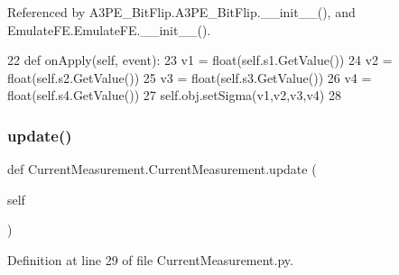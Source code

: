 Referenced by A3\+P\+E\+\_\+\+Bit\+Flip.\+A3\+P\+E\+\_\+\+Bit\+Flip.\+\_\+\+\_\+init\+\_\+\+\_\+(), and Emulate\+F\+E.\+Emulate\+F\+E.\+\_\+\+\_\+init\+\_\+\+\_\+().


\begin{DoxyCode}
22     \textcolor{keyword}{def }onApply(self, event):
23         v1 = float(self.s1.GetValue())
24         v2 = float(self.s2.GetValue())
25         v3 = float(self.s3.GetValue())
26         v4 = float(self.s4.GetValue())
27         self.obj.setSigma(v1,v2,v3,v4)
28 
\end{DoxyCode}
\mbox{\label{classCurrentMeasurement_1_1CurrentMeasurement_a8c8e77e7819a059bcb6eafbfe05cf34f}} 
\subsubsection{\texorpdfstring{update()}{update()}}
{\footnotesize\ttfamily def Current\+Measurement.\+Current\+Measurement.\+update (\begin{DoxyParamCaption}\item[{}]{self }\end{DoxyParamCaption})}



Definition at line 29 of file Current\+Measurement.\+py.



